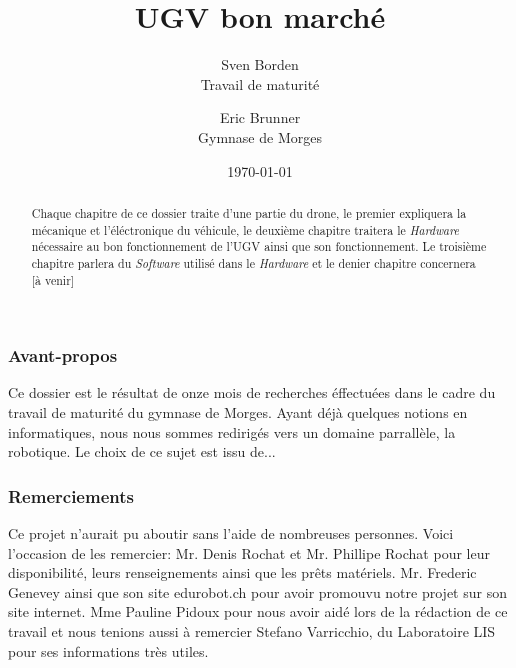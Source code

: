 \documentclass[a4paper,12pt]{article}
\begin{document}
{\selectfont %
\title{UGV bon marché}
\author{Sven Borden\\ \small Travail de maturité \and \normalsize Eric Brunner\\ \small Gymnase de Morges}

\date{\today}
\maketitle

\clearpage
\part{}

\section{Avant-propos}

Ce dossier est le résultat de onze mois de recherches éffectuées dans le cadre du travail de maturité du gymnase de Morges. Ayant déjà quelques notions en informatiques, nous nous sommes redirigés  vers un domaine parrallèle, la robotique. Le choix de ce sujet est issu de...

\clearpage

\section{Remerciements}
Ce projet n'aurait pu aboutir sans l'aide de nombreuses personnes. Voici l'occasion de les remercier: Mr. Denis Rochat et Mr. Phillipe Rochat pour leur disponibilité, leurs renseignements ainsi que les prêts matériels. Mr. Frederic Genevey ainsi que son site edurobot.ch pour avoir promouvu notre projet sur son site internet. Mme Pauline Pidoux pour nous avoir aidé lors de la rédaction de ce travail et nous tenions aussi à remercier Stefano Varricchio, du Laboratoire LIS pour ses informations très utiles.

\clearpage
\begin{abstract}
Chaque chapitre de ce dossier traite d'une partie du drone, le premier expliquera la mécanique et l'éléctronique du véhicule, le deuxième chapitre traitera le \textit{Hardware} nécessaire au bon fonctionnement de l'UGV ainsi que son fonctionnement. Le troisième chapitre parlera du \textit{Software} utilisé dans le \textit{Hardware} et le denier chapitre concernera [à venir]
\end{abstract}
\tableofcontents
\listoffigures
\listoftables 
\clearpage



}
\end{document}
